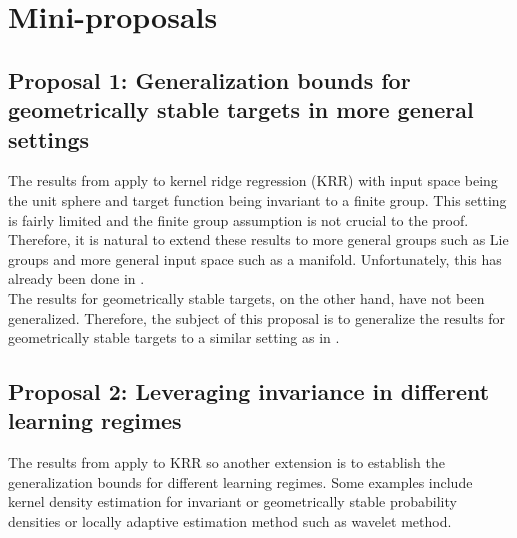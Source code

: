 

\section{Mini-proposals}

\subsection{Proposal 1: Generalization bounds for geometrically stable targets in more general settings} %
The results from \cite{bietti2021sample} apply to kernel ridge regression (KRR) with input space being the unit sphere and target function being invariant to a finite group. This setting is fairly limited and the finite group assumption is not crucial to the proof. Therefore, it is natural to extend these results to more general groups such as Lie groups and more general input space such as a manifold. Unfortunately, this has already been done in \cite{tahmasebi2023exact}.\\
The results for geometrically stable targets, on the other hand, have not been generalized. Therefore, the subject of this proposal is to generalize the results for geometrically stable targets to a similar setting as in \cite{tahmasebi2023exact}.


\subsection{Proposal 2: Leveraging invariance in different learning regimes} %
The results from \cite{bietti2021sample} apply to KRR so another extension is to establish the generalization bounds for different learning regimes. Some examples include kernel density estimation for invariant or geometrically stable probability densities or locally adaptive estimation method such as wavelet method.
